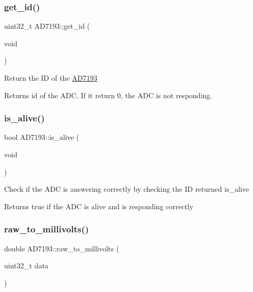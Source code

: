 \subsubsection{\texorpdfstring{get\+\_\+id()}{get\_id()}}
{\footnotesize\ttfamily uint32\+\_\+t A\+D7193\+::get\+\_\+id (\begin{DoxyParamCaption}\item[{void}]{ }\end{DoxyParamCaption})}

Return the ID of the \hyperlink{classAD7193}{A\+D7193} \begin{DoxyReturn}{Returns}
id of the A\+DC. If it return 0, the A\+DC is not responding. 
\end{DoxyReturn}
\mbox{\label{classAD7193_a469f33f9363c4967b4eb95c76e846fbc}} 
\subsubsection{\texorpdfstring{is\+\_\+alive()}{is\_alive()}}
{\footnotesize\ttfamily bool A\+D7193\+::is\+\_\+alive (\begin{DoxyParamCaption}\item[{void}]{ }\end{DoxyParamCaption})}

Check if the A\+DC is answering correctly by checking the ID returned  is\+\_\+alive \begin{DoxyReturn}{Returns}
true if the A\+DC is alive and is responding correctly 
\end{DoxyReturn}
\mbox{\label{classAD7193_aef2fc9da99f8f4aeae7add7f73b97a02}} 
\subsubsection{\texorpdfstring{raw\+\_\+to\+\_\+millivolts()}{raw\_to\_millivolts()}}
{\footnotesize\ttfamily double A\+D7193\+::raw\+\_\+to\+\_\+millivolts (\begin{DoxyParamCaption}\item[{uint32\+\_\+t}]{data }\end{DoxyParamCaption})}

